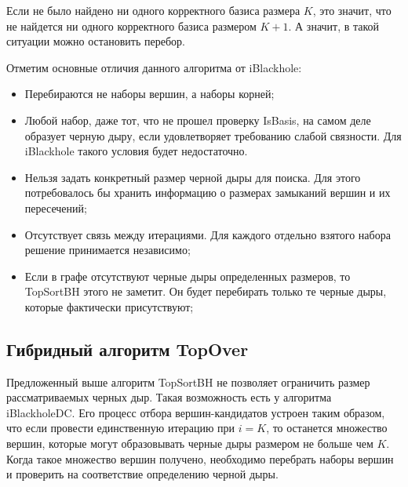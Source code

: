 \documentclass[12pt,a4paper,oneside,openany]{article}
\theoremstyle{definition}
\theoremstyle{lemma}
\theoremstyle{remark}
\begin{document}
Если не было найдено ни одного корректного базиса размера $K$, это значит, что
не найдется ни одного корректного базиса размером $K + 1$. А значит, в такой ситуации
можно остановить перебор.

Отметим основные отличия данного алгоритма от iBlackhole:
    \begin{itemize}
        \item Перебираются не наборы вершин, а наборы корней;
        \item Любой набор, даже тот, что не прошел проверку IsBasis, на самом деле образует черную дыру, если удовлетворяет требованию слабой связности.  Для iBlackhole такого условия будет недостаточно.
        \item Нельзя задать конкретный размер черной дыры для поиска. Для этого потребовалось бы хранить информацию о размерах замыканий вершин и их пересечений;
        \item Отсутствует связь между итерациями. Для каждого отдельно взятого набора решение принимается независимо;
        \item Если в графе отсутствуют черные дыры определенных размеров, то TopSortBH этого не заметит. Он будет перебирать только те черные дыры, которые фактически присутствуют;
    \end{itemize}

\subsection{Гибридный алгоритм TopOver}\label{subsec:topover}

Предложенный выше алгоритм TopSortBH не позволяет ограничить размер рассматриваемых черных дыр.
Такая возможность есть у алгоритма iBlackholeDC. Его процесс отбора вершин-кандидатов устроен таким
образом, что если провести единственную итерацию при $i=K$, то останется множество вершин,
которые могут образовывать черные дыры размером не больше чем $K$. Когда такое множество
вершин получено, необходимо перебрать наборы вершин и проверить на соответствие
определению черной дыры.
\end{document}
